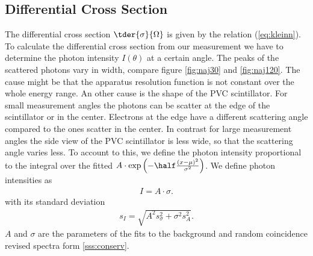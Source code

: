 \subsection{Differential Cross Section}
The differential cross section $\tder{\sigma}{\Omega}$ is given by the
 relation (\ref{eq:kleinn}). To calculate the
differential cross section from our measurement we have to determine the
photon intensity $I(\theta)$ at a
certain angle. The peaks of the scattered
photons vary in width, compare figure \ref{fig:naj30} and \ref{fig:naj120}.
The cause might be that the apparatus resolution function is not constant
over the whole energy range. An other cause is the shape of the PVC
scintillator. For small measurement angles the photons can be scatter at the
edge of the
scintillator or in the center. Electrons at the edge have a different
scattering angle compared to the ones scatter in the center. In contrast for
large
measurement angles the side view of the PVC scintillator is less wide, so
that the scattering angle varies less. To account to this, we define the photon
intensity
proportional to the integral over the fitted  $A \cdot \exp
\left(-\half \frac{(x-\mu)^2}{\sigma^2}\right)$. We define photon
intensities as
\begin{align}
  I = A \cdot \sigma.
\end{align}
with its standard deviation
\begin{align}
  s_I = \sqrt{A^2 s_\sigma^2 + \sigma^2 s_A^2}.
\end{align}
$A$ and $\sigma$ are the parameters of the  fits to the
background and random coincidence revised spectra form \ref{sss:conserv}.

